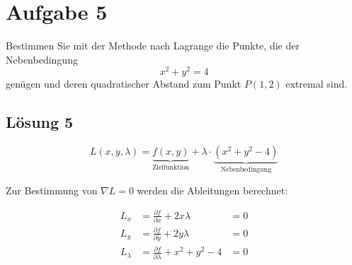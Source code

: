 \documentclass[main.tex]{subfiles}
\begin{document}
\section{Aufgabe 5}
Bestimmen Sie mit der Methode nach Lagrange die Punkte, die der Nebenbedingung
$$
    x^2 + y^2 = 4
$$
genügen und deren quadratischer Abstand zum Punkt $P(1,2)$ extremal sind.

\subsection{Lösung 5}

$$
    L(x,y,\lambda) = \underbrace{f(x,y)}_{\text{Zielfunktion}} + \lambda \cdot \underbrace{(x^2 +y^2 - 4)}_{\text{Nebenbedingung}}
$$

Zur Bestimmung von $\nabla L = 0$ werden die Ableitungen berechnet:

\begin{equation*}
    \begin{aligned}
        L_x & = \frac{\partial f}{\partial x} + 2x\lambda & = 0\\
        L_y & = \frac{\partial f}{\partial y} + 2y\lambda & = 0\\
        L_{\lambda} & = \frac{\partial f}{\partial \lambda} + x^2 +y^2 - 4 & = 0
    \end{aligned}
\end{equation*}
\end{document}

